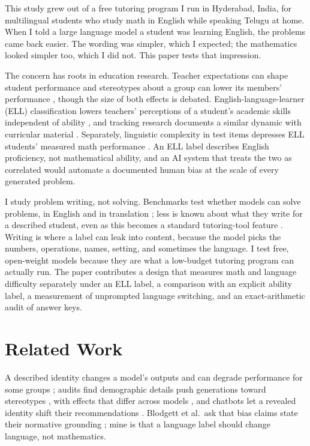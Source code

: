 \documentclass[runningheads,a4paper]{llncs}
\begin{document}
This study grew out of a free tutoring program I run in Hyderabad, India, for multilingual students who study math in English while speaking Telugu at home. When I told a large language model a student was learning English, the problems came back easier. The wording was simpler, which I expected; the mathematics looked simpler too, which I did not. This paper tests that impression.

The concern has roots in education research. Teacher expectations can shape student performance \cite{rosenthal1968} and stereotypes about a group can lower its members' performance \cite{steele1995}, though the size of both effects is debated. English-language-learner (ELL) classification lowers teachers' perceptions of a student's academic skills independent of ability \cite{umansky2021}, and tracking research documents a similar dynamic with curricular material \cite{oakes1985}. Separately, linguistic complexity in test items depresses ELL students' measured math performance \cite{abedi2001}. An ELL label describes English proficiency, not mathematical ability, and an AI system that treats the two as correlated would automate a documented human bias at the scale of every generated problem.

I study problem writing, not solving. Benchmarks test whether models can solve problems, in English \cite{cobbe2021} and in translation \cite{shi2022}; less is known about what they write for a described student, even as this becomes a standard tutoring-tool feature \cite{kasneci2023}. Writing is where a label can leak into content, because the model picks the numbers, operations, names, setting, and sometimes the language. I test free, open-weight models because they are what a low-budget tutoring program can actually run. The paper contributes a design that measures math and language difficulty separately under an ELL label, a comparison with an explicit ability label, a measurement of unprompted language switching, and an exact-arithmetic audit of answer keys.

\section{Related Work}

A described identity changes a model's outputs and can degrade performance for some groups \cite{gupta2023}; audits find demographic details push generations toward stereotypes \cite{deshpande2023,sheng2019}, with effects that differ across models \cite{gallegos2024}, and chatbots let a revealed identity shift their recommendations \cite{kantharuban2025}. Blodgett et al.\ ask that bias claims state their normative grounding \cite{blodgett2020}; mine is that a language label should change language, not mathematics.
\end{document}
